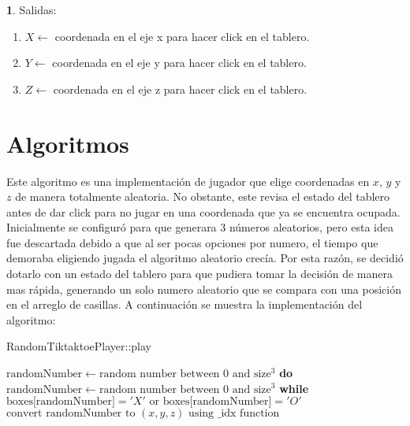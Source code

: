\documentclass[oneside,spanish]{amsart}
\numberwithin{equation}{section}
\numberwithin{figure}{section}
\theoremstyle{definition}
\newtheorem*{defn*}{\protect\definitionname}
\providecommand{\definitionname}{Definición}
\begin{document}
\begin{defn*}
Salidas:\\

\begin{enumerate}

    \item $X\leftarrow$ coordenada en el eje x para hacer click en el tablero.\\
    
    \item $Y\leftarrow$ coordenada en el eje y para hacer click en el tablero.\\

    \item $Z\leftarrow$ coordenada en el eje z para hacer click en el tablero.\\

\end{enumerate}

\end{defn*}

\part{Algoritmos}

Este algoritmo es una implementación de jugador que elige coordenadas en $x$, $y$ y $z$ de manera totalmente aleatoria. No obstante, este revisa el estado del tablero antes de dar click para no jugar en una coordenada que ya se encuentra ocupada.\\

 Inicialmente se configuró para que generara 3 números aleatorios, pero esta idea fue descartada debido a que al ser pocas opciones por numero, el tiempo que demoraba eligiendo jugada el algoritmo aleatorio crecía. Por esta razón, se decidió dotarlo con un estado del tablero para que pudiera tomar la decisión de manera mas rápida, generando un solo numero aleatorio que se compara con una posición en el arreglo de casillas. A continuación se muestra la implementación del algoritmo:\\

\begin{algorithm}
\caption{RandomTiktaktoePlayer::play}
\begin{algorithmic}[1]
    \State $\text{randomNumber} \gets \text{random number between 0 and } \text{size}^3$
    \State \textbf{do}
    \State \hspace{\algorithmicindent} $\text{randomNumber} \gets \text{random number between 0 and } \text{size}^3$
    \State \textbf{while} $\text{boxes[randomNumber]} = 'X' \text{ or } \text{boxes[randomNumber]} = 'O'$
    \State $\text{convert randomNumber to } (x, y, z) \text{ using \_idx function}$
\EndProcedure
\end{algorithmic}
\end{algorithm}
\end{document}
